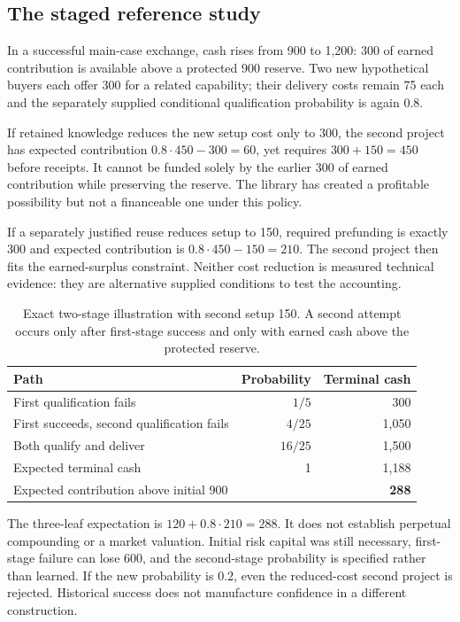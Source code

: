 \documentclass[11pt,letterpaper]{article}
\theoremstyle{remark}\newtheorem{remark}{Remark}[section]
\begin{document}
\subsection{The staged reference study}
In a successful main-case exchange, cash rises from 900 to 1,200: 300 of earned contribution is available above a protected 900 reserve. Two new hypothetical buyers each offer 300 for a related capability; their delivery costs remain 75 each and the separately supplied conditional qualification probability is again 0.8.

If retained knowledge reduces the new setup cost only to 300, the second project has expected contribution $0.8\cdot450-300=60$, yet requires $300+150=450$ before receipts. It cannot be funded solely by the earlier 300 of earned contribution while preserving the reserve. The library has created a profitable possibility but not a financeable one under this policy.

If a separately justified reuse reduces setup to 150, required prefunding is exactly 300 and expected contribution is $0.8\cdot450-150=210$. The second project then fits the earned-surplus constraint. Neither cost reduction is measured technical evidence: they are alternative supplied conditions to test the accounting.

\begin{table}[htbp]\centering\small
\caption{Exact two-stage illustration with second setup 150. A second attempt occurs only after first-stage success and only with earned cash above the protected reserve.}\label{tab:staged}
\begin{tabular}{@{}lrr@{}}\toprule
Path & Probability & Terminal cash\\\midrule
First qualification fails & $1/5$ & 300\\
First succeeds, second qualification fails & $4/25$ & 1,050\\
Both qualify and deliver & $16/25$ & 1,500\\\midrule
Expected terminal cash & 1 & 1,188\\
Expected contribution above initial 900 & & \textbf{288}\\\bottomrule
\end{tabular}
\end{table}

The three-leaf expectation is $120+0.8\cdot210=288$. It does not establish perpetual compounding or a market valuation. Initial risk capital was still necessary, first-stage failure can lose 600, and the second-stage probability is specified rather than learned. If the new probability is 0.2, even the reduced-cost second project is rejected. Historical success does not manufacture confidence in a different construction.
\end{document}

